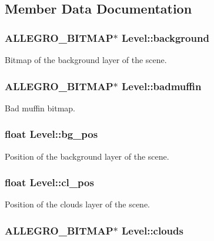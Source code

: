 \subsection{\-Member \-Data \-Documentation}
\hypertarget{structLevel_a4b4dd31284206502977b3d5b95d52abc}{
\subsubsection[{background}]{\setlength{\rightskip}{0pt plus 5cm}\-A\-L\-L\-E\-G\-R\-O\-\_\-\-B\-I\-T\-M\-A\-P$\ast$ {\bf \-Level\-::background}}}\label{structLevel_a4b4dd31284206502977b3d5b95d52abc}
\-Bitmap of the background layer of the scene. \hypertarget{structLevel_addc469e6a9843c509fc640a4e625fa50}{
\subsubsection[{badmuffin}]{\setlength{\rightskip}{0pt plus 5cm}\-A\-L\-L\-E\-G\-R\-O\-\_\-\-B\-I\-T\-M\-A\-P$\ast$ {\bf \-Level\-::badmuffin}}}\label{structLevel_addc469e6a9843c509fc640a4e625fa50}
\-Bad muffin bitmap. \hypertarget{structLevel_a00321214fdc30f67615053d1ca614948}{
\subsubsection[{bg\-\_\-pos}]{\setlength{\rightskip}{0pt plus 5cm}float {\bf \-Level\-::bg\-\_\-pos}}}\label{structLevel_a00321214fdc30f67615053d1ca614948}
\-Position of the background layer of the scene. \hypertarget{structLevel_af466533be369b5ce1f48196a7f3b7b0b}{
\subsubsection[{cl\-\_\-pos}]{\setlength{\rightskip}{0pt plus 5cm}float {\bf \-Level\-::cl\-\_\-pos}}}\label{structLevel_af466533be369b5ce1f48196a7f3b7b0b}
\-Position of the clouds layer of the scene. \hypertarget{structLevel_a27d34b57b66d4e7f733cb6a5cc16ff18}{
\subsubsection[{clouds}]{\setlength{\rightskip}{0pt plus 5cm}\-A\-L\-L\-E\-G\-R\-O\-\_\-\-B\-I\-T\-M\-A\-P$\ast$ {\bf \-Level\-::clouds}}}\label{structLevel_a27d34b57b66d4e7f733cb6a5cc16ff18}
